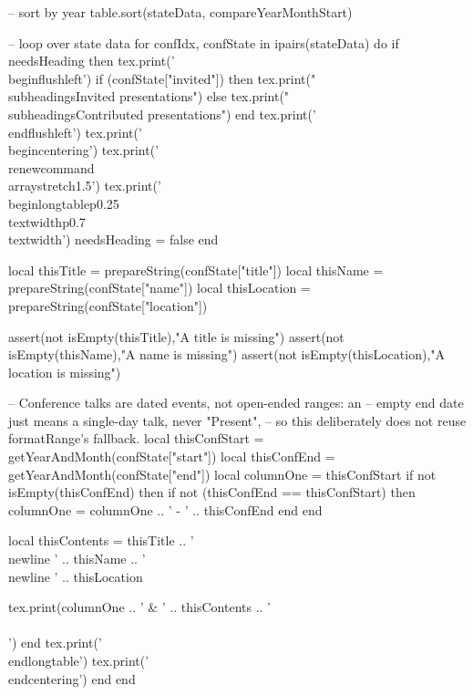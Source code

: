 \documentclass[letterpaper, 10pt]{article}
\newcommand{\subheadings}[1]{\textbf{#1} \vspace{5pt}}
\begin{document}
\begin{luacode}
			-- sort by year
			table.sort(stateData, compareYearMonthStart)

			-- loop over state data
			for confIdx, confState in ipairs(stateData) do
				if needsHeading then
					tex.print('\\begin{flushleft}')
					if (confState["invited"]) then
						tex.print("\\subheadings{Invited presentations}")
					else
						tex.print("\\subheadings{{Contributed presentations}}")
					end
					tex.print('\\end{flushleft}')
					tex.print('\\begin{centering}')
					tex.print('\\renewcommand{\\arraystretch}{1.5}')
					tex.print('\\begin{longtable}{p{0.25\\textwidth}p{0.7\\textwidth}}')
					needsHeading = false
				end

				local thisTitle     = prepareString(confState["title"])
				local thisName      = prepareString(confState["name"])
				local thisLocation  = prepareString(confState["location"])

				assert(not isEmpty(thisTitle),"A title is missing")
				assert(not isEmpty(thisName),"A name is missing")
				assert(not isEmpty(thisLocation),"A location is missing")

				-- Conference talks are dated events, not open-ended ranges: an
				-- empty end date just means a single-day talk, never "Present",
				-- so this deliberately does not reuse formatRange's fallback.
				local thisConfStart = getYearAndMonth(confState["start"])
				local thisConfEnd = getYearAndMonth(confState["end"])
				local columnOne = thisConfStart
				if not isEmpty(thisConfEnd) then
					if not (thisConfEnd == thisConfStart) then
						columnOne = columnOne .. ' - ' .. thisConfEnd
					end
				end

				local thisContents = thisTitle ..
									'\\newline ' .. thisName ..
									'\\newline ' .. thisLocation

				tex.print(columnOne .. ' & ' .. thisContents .. ' \\\\')
			end
			tex.print('\\end{longtable}')
			tex.print('\\end{centering}')
		end
	end


\end{luacode}
\end{document}
